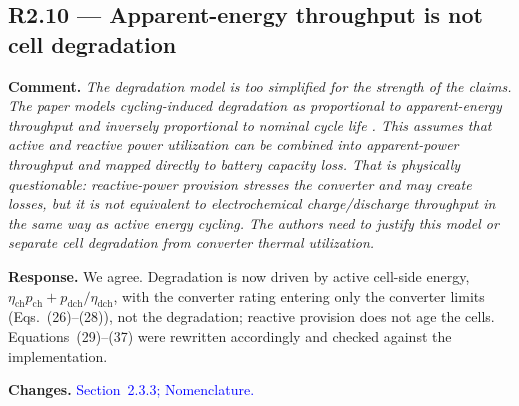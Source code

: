 \documentclass[11pt]{article}
\newcommand{\rcomment}[1]{\par\medskip\noindent\textbf{Comment.} \textit{#1}\par\smallskip}
\newcommand{\rresponse}[1]{\noindent\textbf{Response.} #1\par\smallskip}
\newcommand{\rchanges}[1]{\noindent\textbf{Changes.} \textcolor{blue}{#1}\par\medskip}
\begin{document}
\subsection*{R2.10 --- Apparent-energy throughput is not cell degradation}
\rcomment{
The degradation model is too simplified for the strength of the claims. The paper models cycling-induced degradation as proportional to apparent-energy throughput and inversely proportional to nominal cycle life . This assumes that active and reactive power utilization can be combined into apparent-power throughput and mapped directly to battery capacity loss. That is physically questionable: reactive-power provision stresses the converter and may create losses, but it is not equivalent to electrochemical charge/discharge throughput in the same way as active energy cycling. The authors need to justify this model or separate cell degradation from converter thermal utilization.
}
\rresponse{We agree. Degradation is now driven by active cell-side energy,
$\eta_{\mathrm{ch}} p_{\mathrm{ch}} + p_{\mathrm{dch}}/\eta_{\mathrm{dch}}$, with the converter rating
entering only the converter limits (Eqs.~(26)--(28)), not the degradation; reactive provision does not age the cells.
Equations~(29)--(37) were rewritten accordingly and checked against the implementation.}
\rchanges{Section~2.3.3; Nomenclature.}
\end{document}
